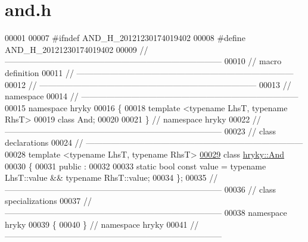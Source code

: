 \hypertarget{and_8h_source}{\section{and.\-h}
}

\begin{DoxyCode}
00001 
00007 \textcolor{preprocessor}{#ifndef AND\_H\_20121230174019402}
00008 \textcolor{preprocessor}{}\textcolor{preprocessor}{#define AND\_H\_20121230174019402}
00009 \textcolor{preprocessor}{}\textcolor{comment}{//
      ------------------------------------------------------------------------------}
00010 \textcolor{comment}{// macro definition}
00011 \textcolor{comment}{//
      ------------------------------------------------------------------------------}
00012 \textcolor{comment}{//
      ------------------------------------------------------------------------------}
00013 \textcolor{comment}{// namespace}
00014 \textcolor{comment}{//
      ------------------------------------------------------------------------------}
00015 \textcolor{keyword}{namespace }hryky
00016 \{
00018     \textcolor{keyword}{template} <\textcolor{keyword}{typename} LhsT, \textcolor{keyword}{typename} RhsT>
00019     \textcolor{keyword}{class }And;
00020 
00021 \} \textcolor{comment}{// namespace hryky}
00022 \textcolor{comment}{//
      ------------------------------------------------------------------------------}
00023 \textcolor{comment}{// class declarations}
00024 \textcolor{comment}{//
      ------------------------------------------------------------------------------}
00028 \textcolor{comment}{}\textcolor{keyword}{template} <\textcolor{keyword}{typename} LhsT, \textcolor{keyword}{typename} RhsT>
\hypertarget{and_8h_source_l00029}{}\hyperlink{classhryky_1_1_and}{00029} \textcolor{keyword}{class }\hyperlink{classhryky_1_1_and}{hryky::And}
00030 \{
00031 \textcolor{keyword}{public} :
00032 
00033     \textcolor{keyword}{static} \textcolor{keywordtype}{bool} \textcolor{keyword}{const} value = \textcolor{keyword}{typename} LhsT::value && \textcolor{keyword}{typename} RhsT::value;
00034 \};
00035 \textcolor{comment}{//
      ------------------------------------------------------------------------------}
00036 \textcolor{comment}{// class specializations}
00037 \textcolor{comment}{//
      ------------------------------------------------------------------------------}
00038 \textcolor{keyword}{namespace }hryky
00039 \{
00040 \} \textcolor{comment}{// namespace hryky}
00041 \textcolor{comment}{//
      ------------------------------------------------------------------------------}

\end{DoxyCode}
